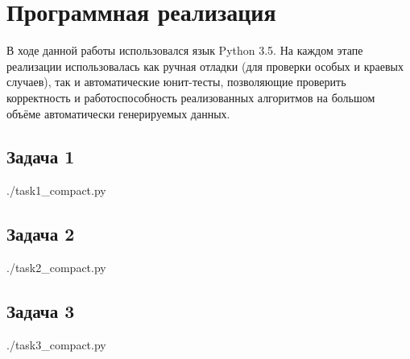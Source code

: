 \section{Программная реализация}

В ходе данной работы использовался язык Python 3.5. На каждом этапе реализации использовалась как ручная отладки (для проверки особых и краевых случаев), так и автоматические юнит-тесты, позволяющие проверить корректность и работоспособность реализованных алгоритмов на большом объёме автоматически генерируемых данных.

\subsection{Задача 1}


{ ./task1_compact.py }

%
%
%
%
%


%

\subsection{Задача 2}

{ ./task2_compact.py }
%
%

\subsection{Задача 3}

{ ./task3_compact.py }

